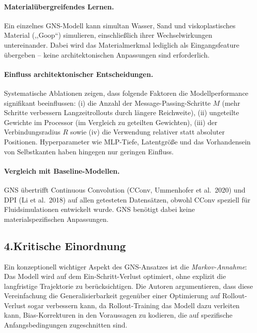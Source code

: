 \documentclass[a4paper,12pt]{article}
\begin{document}
\paragraph{Materialübergreifendes Lernen.}
Ein einzelnes GNS-Modell kann simultan Wasser, Sand und viskoplastisches Material
(,,Goop``) simulieren, einschließlich ihrer Wechselwirkungen untereinander. Dabei
wird das Materialmerkmal lediglich als Eingangsfeature übergeben -- keine
architektonischen Anpassungen sind erforderlich.

\paragraph{Einfluss architektonischer Entscheidungen.}
Systematische Ablationen zeigen, dass folgende Faktoren die Modellperformance
signifikant beeinflussen: (i) die Anzahl der Message-Passing-Schritte $M$ (mehr
Schritte verbessern Langzeitrollouts durch längere Reichweite), (ii) ungeteilte
Gewichte im Processor (im Vergleich zu geteilten Gewichten), (iii) der
Verbindungsradius $R$ sowie (iv) die Verwendung relativer statt absoluter
Positionen. Hyperparameter wie MLP-Tiefe, Latentgröße und das Vorhandensein von
Selbstkanten haben hingegen nur geringen Einfluss.

\paragraph{Vergleich mit Baseline-Modellen.}
GNS übertrifft Continuous Convolution (CConv, Ummenhofer et al.\ 2020) und DPI
(Li et al.\ 2018) auf allen getesteten Datensätzen, obwohl CConv speziell für
Fluidsimulationen entwickelt wurde. GNS benötigt dabei keine materialspezifischen
Anpassungen.

\subsection*{4.\quad Kritische Einordnung}

Ein konzeptionell wichtiger Aspekt des GNS-Ansatzes ist die \emph{Markov-Annahme}:
Das Modell wird auf dem Ein-Schritt-Verlust optimiert, ohne explizit die
langfristige Trajektorie zu berücksichtigen. Die Autoren argumentieren, dass
diese Vereinfachung die Generalisierbarkeit gegenüber einer Optimierung auf
Rollout-Verlust sogar verbessern kann, da Rollout-Training das Modell dazu
verleiten kann, Bias-Korrekturen in den Voraussagen zu kodieren, die auf
spezifische Anfangsbedingungen zugeschnitten sind.
\end{document}
